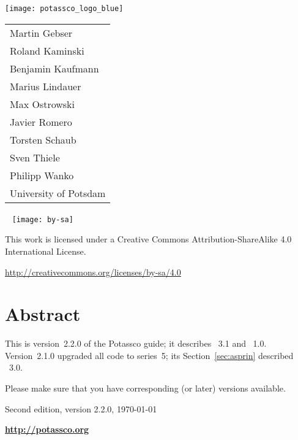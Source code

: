 \thispagestyle{empty}
\bigskip
\noindent
\texttt{[image: potassco\_logo\_blue]}
\bigskip

\vfill

\hspace{5pt}
{\Large\color{potcolor}
\begin{tabular}{l}
Martin Gebser \\
Roland Kaminski \\
Benjamin Kaufmann \\
Marius Lindauer \\
Max Ostrowski \\
Javier Romero \\
Torsten Schaub \\
Sven Thiele \\
Philipp Wanko \\[30pt]
University of Potsdam
\end{tabular}}

\newpage
\thispagestyle{empty}\
\vfill
\noindent
\texttt{[image: by-sa]}

\bigskip

\noindent
This work is licensed under a Creative Commons Attribution-ShareAlike 4.0\\ International License.

\medskip

\noindent
\url{http://creativecommons.org/licenses/by-sa/4.0}
\newpage
\thispagestyle{empty}\
\section*{Abstract}


\bigskip
\noindent
This is version~2.2.0 of the Potassco guide;
it describes \asprin~3.1 and ~1.0.
%
Version~2.1.0 upgraded all code to \clingo{} series~5;
its Section~\ref{sec:asprin} described \asprin~3.0.

\medskip
\noindent
Please make sure that you have corresponding (or later) versions available.

\vfill

\begin{center}

\end{center}

\vfill

\noindent
Second edition, version 2.2.0, \today\ %

\bigskip
\noindent
{\LARGE\bf\url{http://potassco.org}}






